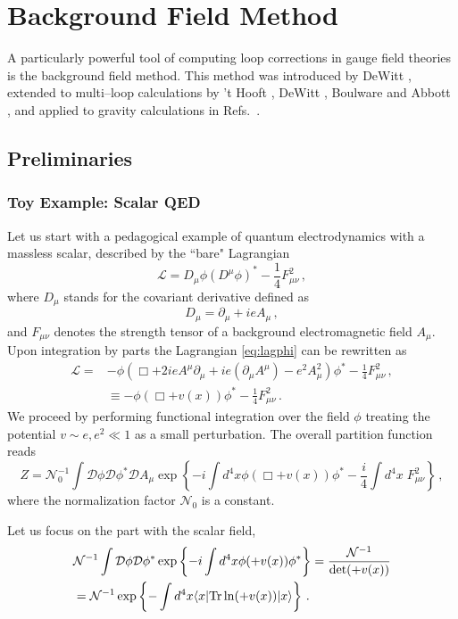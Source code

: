 \documentclass[12pt]{article}
\newcommand{\be}{\begin{equation}}
\newcommand{\ee}{\end{equation}}
\newcommand\m{\mu}
\newcommand\D{\Delta}
\newcommand\n{\nu}
\def\d{\partial}
\renewcommand{\ln}{\mathop{\rm ln}\nolimits}
\renewcommand{\D}{\mathcal{D}}
\begin{document}
\section{Background Field Method}
\label{sec:back}

A particularly powerful tool of computing loop corrections in gauge field theories
is the background
field method.
This method was introduced by DeWitt \cite{DeWitt:1967ub}, extended to multi--loop calculations by 't Hooft \cite{'tHooft:1975vy}, DeWitt \cite{DeWitt:1980jv}, Boulware \cite{Boulware:1980av} and Abbott \cite{Abbott:1980hw}, and applied to gravity calculations in Refs.~\cite{'tHooft:1973us,'tHooft:1974bx}.

\subsection{Preliminaries}

\subsubsection{Toy Example: Scalar QED}

Let us start with a pedagogical example of quantum electrodynamics with
a massless scalar, described by the ``bare" Lagrangian
\be
\label{eq:lagphi}
\mathcal{L}=D_\m \phi (D^\m \phi)^*-\frac{1}{4}F_{\mu \n}^2\,,
\ee
where $D_\mu$ stands for the covariant derivative defined as
\be
D_\mu=\d_\m+ieA_\m \,,
\ee
and $F_{\mu \nu}$ denotes the strength tensor of a background electromagnetic
field $A_{\mu}$.
Upon integration by parts the Lagrangian \eqref{eq:lagphi} can be rewritten as
\be
\begin{split}
 \mathcal{L}=&-\phi (\Box +2ie A^\m \d_\m+ie(\d_\m A^\m)-e^2A_\m^2) \phi^*-\frac{1}{4}F_{\mu \n}^2\,,\\
 &\equiv -\phi (\Box +v(x)) \phi^*-\frac{1}{4}F_{\mu \n}^2\,.
 \end{split}
\ee
We proceed by performing functional integration over the field $\phi$
treating the potential $v \sim e,e^2\ll 1$ as a small perturbation.
The overall partition function reads
\be
Z= \mathcal{N}_0^{-1}\int \D\phi\D\phi^* \D A_\mu \exp\left\{-i\int d^4x \phi (\Box +v(x)) \phi^* -\frac{i}{4}
\int d^4x \;F_{\mu \nu}^2
\right\}\,,
\ee
where the normalization factor $\mathcal{N}_0$ is a constant.

Let us focus on the part with the scalar field,
\be
\label{eq:pathint}
\begin{split}
&\mathcal{N}^{-1}\int \D \phi \D \phi^* \exp\left\{-i\int d^4x \phi (\Box +v(x)) \phi^* \right\}=\frac{\mathcal{N}^{-1}}{\text{det}(\Box +v(x))}\\
&=
\mathcal{N}^{-1}\exp\left\{-\int d^4x \langle x| \text{Tr}\ln(\Box +v(x)) |x\rangle \right\}\,.
\end{split}
\ee
\end{document}
